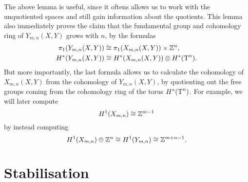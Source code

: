 The above lemma is useful, since it oftens allows us to work with the
unquotiented spaces and still gain information about the
quotients.
This lemma also immediately proves the claim that the fundamental
group and cohomology ring of $Y_{m,n}(X,Y)$ grows with $n$, by the
formulas
\begin{align*}
  \pi_1(Y_{m,n}(X,Y)) &\cong \pi_1(X_{m,n}(X,Y)) \times \mathbb{Z}^n, \\
  H^*(Y_{m,n}(X,Y)) &\cong H^*(X_{m,n}(X,Y)) \otimes H^*(\operatorname{T}^n).
\end{align*}
But more importantly, the last formula allows us to calculate the
cohomology of $X_{m,n}(X,Y)$ from the cohomology of $Y_{m,n}(X,Y)$, by
quotienting out the free groups coming from the cohomology ring of the
torus $H^*(\operatorname{T}^n)$. For example, we will later compute 
\[ H^1(X_{m,n}) \cong \mathbb{Z}^{m-1} \]
by instead computing
\[ H^1(X_{m,n}) \oplus \mathbb{Z}^n \cong H^1(Y_{m,n}) \cong \mathbb{Z}^{m+n-1}. \]

\section{Stabilisation} 
\label{sec:rum-stabil}

